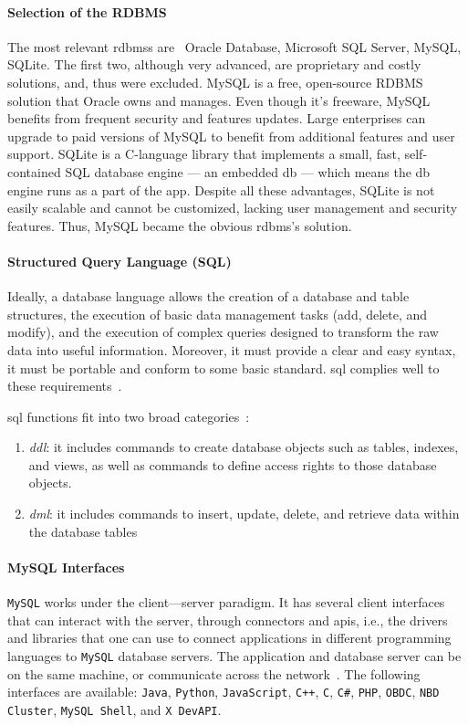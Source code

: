 \paragraph{Selection of the RDBMS}
The most relevant \glspl{rdbms} are~\cite{modernDBChoice} Oracle Database,
Microsoft SQL Server, MySQL, SQLite. The first two, although very advanced,
are proprietary and costly solutions, and, thus were excluded. MySQL is a free,
open-source RDBMS solution that Oracle owns and manages. Even though it's
freeware, MySQL benefits from frequent security and features updates. Large
enterprises can upgrade to paid versions of MySQL to benefit from additional
features and user support. SQLite is a C-language library that implements a
small, fast, self-contained SQL database engine ---  an embedded \gls{db} ---
which means the \gls{db} engine runs as a part of the app. Despite all these
advantages, SQLite is not easily scalable and cannot be customized, lacking user
management and security features. Thus, MySQL became the obvious \gls{rdbms}'s
solution.

\paragraph{Structured Query Language (SQL)}
Ideally, a database language allows the creation of a database and table
structures, the execution of basic data management tasks (add, delete, and
modify), and the execution of complex queries designed to transform the raw data
into useful information. Moreover, it must provide a clear and easy syntax, it
must be portable and conform to some basic standard. \gls{sql} complies well to
these requirements~\cite{coronel2016database}.

\gls{sql} functions fit into two broad categories~\cite{coronel2016database}:
\begin{enumerate}
\item \emph{\gls{ddl}}: it includes commands to create database objects
  such as tables, indexes, and views, as well as commands to define access
  rights to those database objects.
\item \emph{\gls{dml}}: it includes commands to insert, update, delete,
  and retrieve data within the database tables
\end{enumerate}

\paragraph{MySQL Interfaces}%
\texttt{MySQL} works under the client---server paradigm. It has several client
interfaces that can interact with the server, through connectors and
\glspl{api}, i.e., the drivers and libraries that one can use to connect
applications in different programming languages to \texttt{MySQL} database
servers.
The application and database server can be on the same machine, or communicate
across the network~\cite{MysqlConnAPIs}.
The following interfaces are available: \texttt{Java}, \texttt{Python},
\texttt{JavaScript}, \texttt{C++}, \texttt{C},
\texttt{C\#},
\texttt{PHP},
\texttt{OBDC}, \texttt{NBD Cluster},
\texttt{MySQL Shell}, and \texttt{X DevAPI}.

